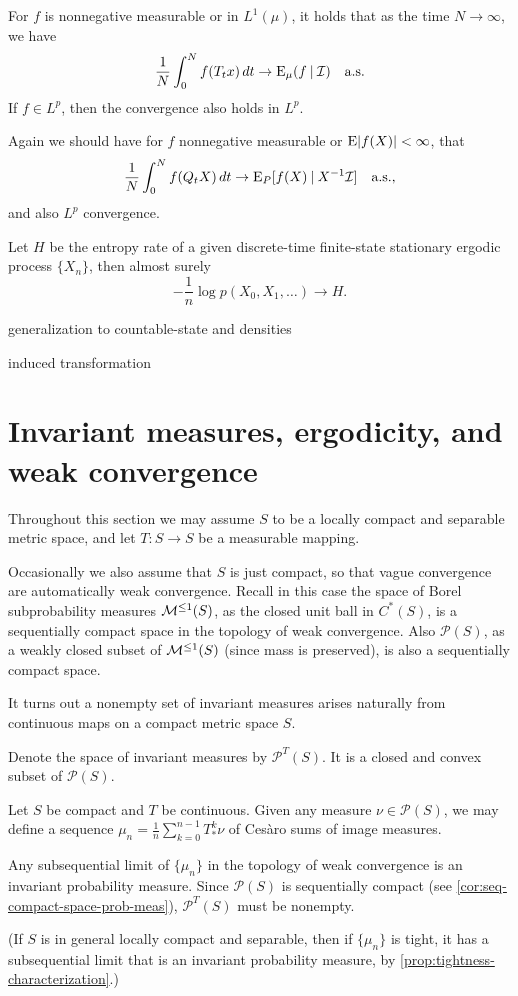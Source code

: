 \begin{namedthm}
    For $f$ is nonnegative measurable or in $L^1(\mu)$, it holds that as the time $N \to \infty$, we have \[
        \frac{1}{N} \int_0^N f(T_tx)\,dt \to \mathop{}\!\mathrm{E}_\mu(f \mathbin{|} \mathcal I) \quad\text{a.s.}
    \] If $f \in L^p$, then the convergence also holds in $L^p$.
\end{namedthm}

Again we should have for $f$ nonnegative measurable or $\mathop{}\!\mathrm{E}\lvert f(X) \rvert < \infty$, that \[
    \frac{1}{N} \int_0^N f(Q_tX)\,dt \to \mathop{}\!\mathrm{E}_P[f(X) \mathbin{|} X^{-1}\mathcal I] \quad\text{a.s.},
\] and also $L^p$ convergence.

\begin{namedthm}
    Let $H$ be the entropy rate of a given discrete-time finite-state stationary ergodic process $\{X_n\}$, then almost surely \[
        -\frac{1}{n}\log p(X_0,X_1,\dotsc) \to H.
    \]
\end{namedthm}

generalization to countable-state and densities

induced transformation

\section{Invariant measures, ergodicity, and weak convergence}
Throughout this section we may assume $S$ to be a locally compact and separable metric space, and let $T\colon S \to S$ be a measurable mapping.

Occasionally we also assume that $S$ is just compact, so that vague convergence are automatically weak convergence. Recall in this case the space of Borel subprobability measures $\mathcal{M}^{\leq 1}(S)$, as the closed unit ball in $C^*(S)$, is a sequentially compact space in the topology of weak convergence. Also $\mathcal P(S)$, as a weakly closed subset of $\mathcal{M}^{\leq 1}(S)$ (since mass is preserved), is also a sequentially compact space.

It turns out a nonempty set of invariant measures arises naturally from continuous maps on a compact metric space $S$.

Denote the space of invariant measures by $\mathcal P^T(S)$. It is a closed and convex subset of $\mathcal P(S)$.

\begin{namedthm}
    Let $S$ be compact and $T$ be continuous. Given any measure $\nu \in \mathcal P(S)$, we may define a sequence $\mu_n = \frac{1}{n} \sum_{k=0}^{n-1} T_*^k \nu$ of Cesàro sums of image measures.
    
    Any subsequential limit of $\{\mu_n\}$ in the topology of weak convergence is an invariant probability measure. Since $\mathcal P(S)$ is sequentially compact (see \cref{cor:seq-compact-space-prob-meas}), $\mathcal P^T(S)$ must be nonempty.

    (If $S$ is in general locally compact and separable, then if $\{\mu_n\}$ is tight, it has a subsequential limit that is an invariant probability measure, by \cref{prop:tightness-characterization}.)
\end{namedthm}

